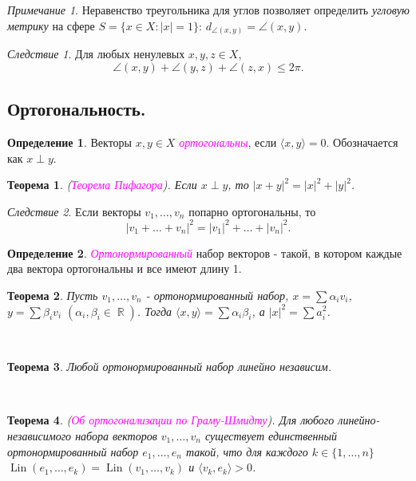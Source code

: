 \documentclass[a4paper,100pt]{article}
\theoremstyle{indented}
\newtheorem{theorem}{Теорема}
\theoremstyle{definition}
\newtheorem{defn}{Определение}
\theoremstyle{remark}
\newtheorem{remark}{Примечание}
\newtheorem{cons}{Следствие}
\DeclareMathOperator{\RR}{\mathbb{R}}
\DeclareMathOperator{\Lin}{Lin}
\begin{document}
\begin{remark}
    Неравенство треугольника для углов позволяет определить \textit{угловую метрику} на сфере $S = \{x \in X : |x| = 1\}$: $d_{\angle (x, y)} = \angle(x, y)$. 
\end{remark}

\begin{cons}
    Для любых ненулевых $x, y, z\in X$, 
    \[
        \angle(x, y)+\angle(y, z)+\angle(z, x)\leq 2\pi. 
    \]
\end{cons}

\subsection{Ортогональность.}

\begin{defn}
    Векторы $x, y\in X$ \textit{\textcolor{magenta}{\hypertarget{s61}{ортогональны}}}, если $\langle x, y \rangle = 0$. Обозначается как $x\perp y$. 
\end{defn}

\begin{theorem}
    (\textit{\textcolor{magenta}{\hypertarget{s62}{Теорема Пифагора}}}). Если $x \perp y$, то $|x+y|^2=|x|^2+|y|^2$. 
\end{theorem}

\begin{cons}
    Если векторы $v_1, \ldots, v_n$ попарно ортогональны, то 
    \[
        |v_1+\ldots+v_n|^2=|v_1|^2+\ldots+|v_n|^2. 
    \]
\end{cons}

\begin{defn}
    \textit{\textcolor{magenta}{\hypertarget{s63}{Ортонормированный}}} набор векторов - такой, в котором каждые два вектора ортогональны и все имеют длину 1.
\end{defn}

\begin{theorem}
    Пусть $v_1, \ldots, v_n$ - ортонормированный набор, $x=\sum \alpha_i v_i$, $y=\sum \beta_i v_i$ $(\alpha_i, \beta_i \in \RR)$. Тогда $\langle x, y \rangle = \sum \alpha_i \beta_i$, а $|x|^2=\sum a_i^2$. 
\end{theorem} \

\begin{theorem}
    Любой ортонормированный набор линейно независим.
\end{theorem} \

\begin{theorem}
    (\textit{\textcolor{magenta}{\hypertarget{s64}{Об ортогонализации по Граму-Шмидту}}}). Для любого линейно-независимого набора векторов $v_1, \ldots, v_n$ существует единственный ортонормированный набор $e_1, \ldots, e_n$ такой, что для каждого $k\in \{1, \ldots, n\}$ $\Lin (e_1, \ldots, e_k)=\Lin(v_1, \ldots, v_k)$ и $\langle v_k, e_k \rangle > 0$. 
\end{theorem}
\end{document}
